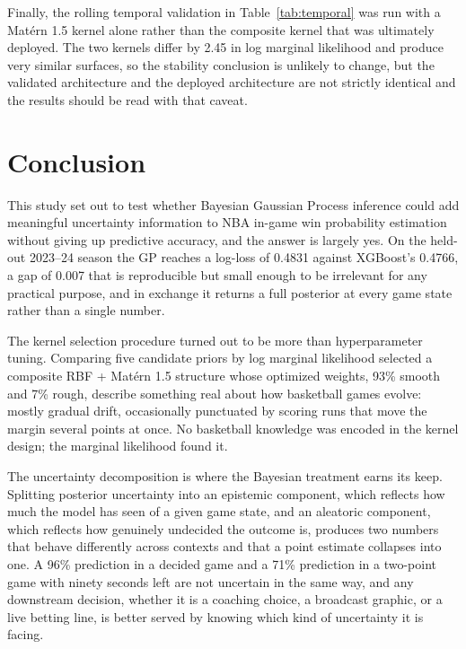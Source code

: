 \documentclass[conference]{IEEEtran}
\begin{document}
Finally, the rolling temporal validation in Table~\ref{tab:temporal} was run with a Mat\'{e}rn 1.5 kernel alone rather than the composite kernel that was ultimately deployed. The two kernels differ by 2.45 in log marginal likelihood and produce very similar surfaces, so the stability conclusion is unlikely to change, but the validated architecture and the deployed architecture are not strictly identical and the results should be read with that caveat.

\section{Conclusion}

This study set out to test whether Bayesian Gaussian Process inference could add meaningful uncertainty information to NBA in-game win probability estimation without giving up predictive accuracy, and the answer is largely yes. On the held-out 2023--24 season the GP reaches a log-loss of 0.4831 against XGBoost's 0.4766, a gap of 0.007 that is reproducible but small enough to be irrelevant for any practical purpose, and in exchange it returns a full posterior at every game state rather than a single number.

The kernel selection procedure turned out to be more than hyperparameter tuning. Comparing five candidate priors by log marginal likelihood selected a composite RBF + Mat\'{e}rn 1.5 structure whose optimized weights, 93\% smooth and 7\% rough, describe something real about how basketball games evolve: mostly gradual drift, occasionally punctuated by scoring runs that move the margin several points at once. No basketball knowledge was encoded in the kernel design; the marginal likelihood found it.

The uncertainty decomposition is where the Bayesian treatment earns its keep. Splitting posterior uncertainty into an epistemic component, which reflects how much the model has seen of a given game state, and an aleatoric component, which reflects how genuinely undecided the outcome is, produces two numbers that behave differently across contexts and that a point estimate collapses into one. A 96\% prediction in a decided game and a 71\% prediction in a two-point game with ninety seconds left are not uncertain in the same way, and any downstream decision, whether it is a coaching choice, a broadcast graphic, or a live betting line, is better served by knowing which kind of uncertainty it is facing.
\end{document}
